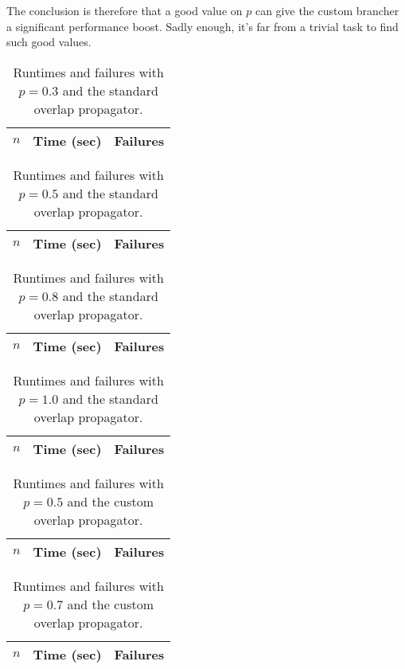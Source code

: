 \documentclass[a4paper,11pt]{article}
\begin{document}
The conclusion is therefore that a good value on $p$ can give the custom brancher a significant performance boost. Sadly enough, it's far from a trivial task to find such good values.


\begin{table}[h]
\centering
\begin{tabular}{r|r|r}
$n$ & Time (sec) & Failures \\
\hline   
\end{tabular}
\caption{Runtimes and failures with $p = 0.3$ and the standard overlap propagator.} 
\end{table}

\begin{table}[h]
\centering
\begin{tabular}{r|r|r}
$n$ & Time (sec) & Failures \\
\hline   
\end{tabular}
\caption{Runtimes and failures with $p = 0.5$ and the standard overlap propagator.} 
\end{table}

\begin{table}[h]
\centering
\begin{tabular}{r|r|r}
$n$ & Time (sec) & Failures \\
\hline   
\end{tabular}
\caption{Runtimes and failures with $p = 0.8$ and the standard overlap propagator.} 
\end{table}

\begin{table}[h]
\centering
\begin{tabular}{r|r|r}
$n$ & Time (sec) & Failures \\
\hline   
\end{tabular}
\caption{Runtimes and failures with $p = 1.0$ and the standard overlap propagator.} 
\end{table}

\begin{table}[h]
\centering
\begin{tabular}{r|r|r}
$n$ & Time (sec) & Failures \\
\hline   
\end{tabular}
\caption{Runtimes and failures with $p = 0.5$ and the custom overlap propagator.} 
\end{table}

\begin{table}[h]
\centering
\begin{tabular}{r|r|r}
$n$ & Time (sec) & Failures \\
\hline   
\end{tabular}
\caption{Runtimes and failures with $p = 0.7$ and the custom overlap propagator.} 
\end{table}
\end{document}
